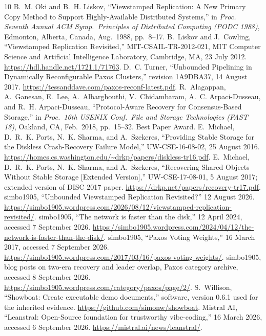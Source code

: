 \documentclass[10pt,journal,letterpaper]{IEEEtran}
\begin{document}
\begin{thebibliography}{10}
 B.~M. Oki and B.~H. Liskov, ``Viewstamped Replication: A New
Primary Copy Method to Support Highly-Available Distributed Systems,'' in
\emph{Proc. Seventh Annual ACM Symp.\ Principles of Distributed Computing
(PODC 1988)}, Edmonton, Alberta, Canada, Aug.\ 1988, pp.~8--17.
 B.~Liskov and J.~Cowling, ``Viewstamped Replication
Revisited,'' MIT-CSAIL-TR-2012-021, MIT Computer Science and Artificial
Intelligence Laboratory, Cambridge, MA, 23 July 2012.
\url{https://hdl.handle.net/1721.1/71763}.
 D.~C. Turner, ``Unbounded Pipelining in Dynamically
Reconfigurable Paxos Clusters,'' revision 1A9DBA37, 14 August 2017.
\url{https://tessanddave.com/paxos-reconf-latest.pdf}.
 R.~Alagappan, A.~Ganesan, E.~Lee, A.~Albarghouthi,
V.~Chidambaram, A.~C. Arpaci-Dusseau, and R.~H. Arpaci-Dusseau,
``Protocol-Aware Recovery for Consensus-Based Storage,'' in \emph{Proc.\
16th USENIX Conf.\ File and Storage Technologies (FAST 18)}, Oakland, CA,
Feb.\ 2018, pp.~15--32. Best Paper Award.
 E.~Michael, D.~R.~K. Ports, N.~K. Sharma, and A.~Szekeres,
``Providing Stable Storage for the Diskless Crash-Recovery Failure Model,''
UW-CSE-16-08-02, 25 August 2016.
\url{https://homes.cs.washington.edu/~drkp/papers/diskless-tr16.pdf}.
\bibitem{recovery} E.~Michael, D.~R.~K. Ports, N.~K. Sharma, and A.~Szekeres,
``Recovering Shared Objects Without Stable Storage [Extended Version],''
UW-CSE-17-08-01, 5 August 2017; extended version of DISC 2017 paper.
\url{https://drkp.net/papers/recovery-tr17.pdf}.
 simbo1905, ``Unbounded Viewstamped Replication Revisited?''
12 August 2026.
\url{https://simbo1905.wordpress.com/2026/08/12/viewstamped-replication-revisited/}.
\bibitem{netdisk} simbo1905, ``The network is faster than the disk,'' 12 April
2024, accessed 7 September 2026.
\url{https://simbo1905.wordpress.com/2024/04/12/the-network-is-faster-than-the-disk/}.
\bibitem{votingweights} simbo1905, ``Paxos Voting Weights,'' 16 March 2017,
accessed 7 September 2026.
\url{https://simbo1905.wordpress.com/2017/03/16/paxos-voting-weights/}.
\bibitem{trexposts} simbo1905, blog posts on two-era recovery and leader
overlap, Paxos category archive, accessed 8 September 2026.
\url{https://simbo1905.wordpress.com/category/paxos/page/2/}.
 S.~Willison, ``Showboat: Create executable demo documents,''
software, version 0.6.1 used for the inherited evidence.
\url{https://github.com/simonw/showboat}.
 Mistral AI, ``Leanstral: Open-Source foundation for
trustworthy vibe-coding,'' 16 March 2026, accessed 6 September 2026.
\url{https://mistral.ai/news/leanstral/}.
\end{thebibliography}
\end{document}
